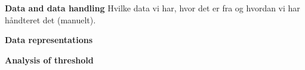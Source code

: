 \textbf{Data and data handling}
Hvilke data vi har, hvor det er fra og hvordan vi har håndteret det (manuelt).

\noindent
\textbf{Data representations}


\noindent
\textbf{Analysis of threshold}

